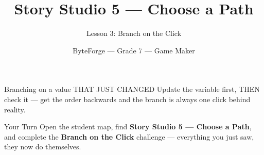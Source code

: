 \documentclass[aspectratio=169]{beamer}
\title{Story Studio 5 — Choose a Path}
\subtitle{Lesson 3: Branch on the Click}
\author{ByteForge --- Grade 7 --- Game Maker}
\date{}
\begin{document}
\begin{frame}
    \titlepage
\end{frame}

\begin{frame}{Branching on a value THAT JUST CHANGED}
    \Large
    Update the variable first, THEN check it — get the order backwards and the branch is always one click behind reality.
\end{frame}

\begin{frame}{Your Turn}
    \Large
    Open the student map, find \textbf{Story Studio 5 — Choose a Path}, and complete
    the \textbf{Branch on the Click} challenge --- everything you just saw, they now do themselves.
\end{frame}
\end{document}
